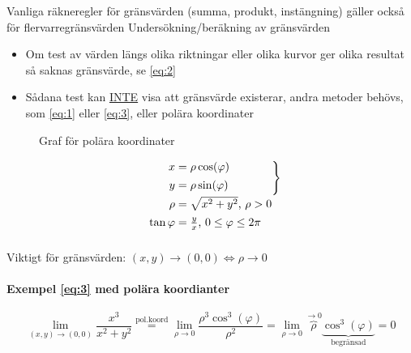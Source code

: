 \documentclass{article}
\begin{document}
Vanliga räkneregler för gränsvärden (summa, produkt, instängning) gäller också för flervarregränsvärden
Undersökning/beräkning av gränsvärden

\begin{itemize}
\item Om test av värden längs olika riktningar eller olika kurvor ger olika resultat så saknas gränsvärde, se \eqref{eq:2}
\item Sådana test kan \underline{INTE} visa att gränsvärde existerar, andra metoder behövs, som \eqref{eq:1} eller \eqref{eq:3}, eller polära koordinater
\end{itemize}

\begin{figure}[ht] 
  \caption{Graf för polära koordinater} \label{fig:2}
\end{figure}

\[
	\def\arraystretch{1.1}
	\begin{blockarray}{r@{\;}l}
	\begin{block}{r@{\;}l\}}
		x & = \rho \cos(\varphi) \\[\jot]
		y & = \rho \sin(\varphi) \\[\jot]
	\end{block}
	\rho  & = \sqrt{x^2+y^2} \text{, } \rho > 0 \\ [\jot]
	\tan{\varphi} & = \frac{y}{x} \text{, } 0 \leq \varphi \leq 2\pi
	\end{blockarray}
\]
Viktigt för gränsvärden: \( (x,y) \rightarrow (0,0) \iff \rho \rightarrow 0 \)

\newpage

\paragraph{Exempel \eqref{eq:3} med polära koordianter}

\[
	\lim_{(x,y) \rightarrow (0,0)} \frac{x^3}{x^2+y^2} \overset{\mathrm{pol.koord}}{=} \lim_{\rho \rightarrow 0} \frac{\rho^3\cos^3(\varphi)}{\rho^2} = \lim_{\rho \rightarrow 0} \overbrace{\rho}^{\rightarrow 0}\underbrace{\cos^3(\varphi)}_\text{begränsad} = 0
\]
\end{document}
